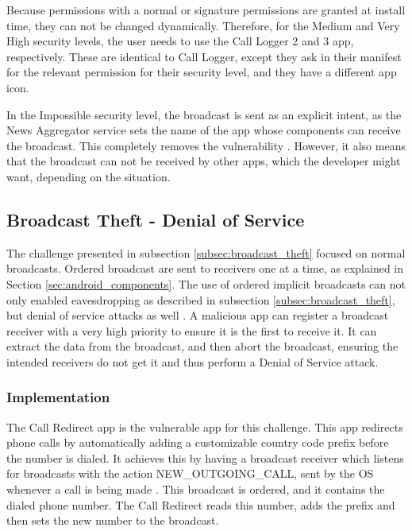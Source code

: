     Because permissions with a normal or signature permissions are granted at install time, they can not be changed dynamically. Therefore, for the Medium and Very High security levels, the user needs to use the Call Logger 2 and 3 app, respectively. These are identical to Call Logger, except they ask in their manifest for the relevant permission for their security level, and they have a different app icon.
    
    In the Impossible security level, the broadcast is sent as an explicit intent, as the News Aggregator service sets the name of the app whose components can receive the broadcast. This completely removes the vulnerability \cite{2010_icc_paper}. However, it also means that the broadcast can not be received by other apps, which the developer might want, depending on the situation.
    
    \subsection{Broadcast Theft - Denial of Service}
        \label{subsec:broadcast_theft_dos}
        
    The challenge presented in subsection \ref{subsec:broadcast_theft} focused on normal broadcasts. Ordered broadcast are sent to receivers one at a time, as explained in Section \ref{sec:android_components}. The use of ordered implicit broadcasts can not only enabled eavesdropping as described in subsection \ref{subsec:broadcast_theft}, but denial of service attacks as well \cite{2010_icc_paper}. A malicious app can register a broadcast receiver with a very high priority to ensure it is the first to receive it. It can extract the data from the broadcast, and then abort the broadcast, ensuring the intended receivers do not get it and thus perform a Denial of Service attack.
    
    \subsubsection{Implementation}
        \label{subsubsec:broadcast_theft_dos_implementation}

    The Call Redirect app is the vulnerable app for this challenge. This app redirects phone calls by automatically adding a customizable country code prefix before the number is dialed. It achieves this by having a broadcast receiver which listens for broadcasts with the action NEW\_OUTGOING\_CALL, sent by the OS whenever a call is being made \cite{intents}. This broadcast is ordered, and it contains the dialed phone number. The Call Redirect reads this number, adds the prefix and then sets the new number to the broadcast.
    

